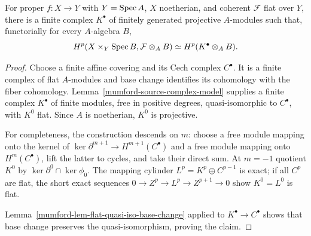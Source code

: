 \begin{theorem}
\label{mumford-thm-grothendieck-complex}
For proper $f:X\to Y$ with $Y=\operatorname{Spec} A$, $X$ noetherian, and coherent
$\mathcal F$ flat over $Y$, there is a finite complex $K^\bullet$ of finitely generated
projective $A$-modules such that, functorially for every $A$-algebra $B$,
\[
 H^p(X\times_Y\operatorname{Spec} B,\mathcal F\otimes_A B)
 \simeq H^p(K^\bullet\otimes_A B).
\]
\end{theorem}
\begin{proof}
Choose a finite affine covering and its Cech complex $C^\bullet$. It is a
finite complex of flat $A$-modules and base change identifies its cohomology
with the fiber cohomology. Lemma~\ref{mumford-source-complex-model} supplies
a finite complex $K^\bullet$ of finite modules, free in positive degrees,
quasi-isomorphic to $C^\bullet$, with $K^0$ flat. Since $A$ is noetherian,
$K^0$ is projective.

For completeness, the construction descends on $m$: choose a free module
mapping onto the kernel of $\ker\partial^{m+1}\to H^{m+1}(C^\bullet)$ and a
free module mapping onto $H^m(C^\bullet)$, lift the latter to cycles, and
take their direct sum. At $m=-1$ quotient $K^0$ by
$\ker\partial^0\cap\ker\phi_0$. The mapping cylinder
$L^p=K^p\oplus C^{p-1}$ is exact; if all $C^p$ are flat, the short exact
sequences $0\to Z^p\to L^p\to Z^{p+1}\to0$ show $K^0=L^0$ is flat.

Lemma~\ref{mumford-lem-flat-quasi-iso-base-change} applied to $K^\bullet\to C^\bullet$
shows that base change preserves the quasi-isomorphism, proving the claim.
\end{proof}

